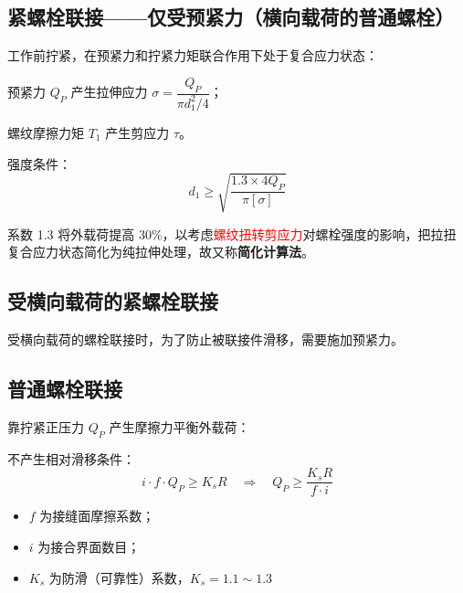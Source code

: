 \subsection{紧螺栓联接——仅受预紧力（横向载荷的普通螺栓）}

工作前拧紧，在预紧力和拧紧力矩联合作用下处于复合应力状态：

预紧力 $Q_P$ 产生拉伸应力 $\sigma=\dfrac{Q_P}{\pi d_1^2/4}$；

螺纹摩擦力矩 $T_1$ 产生剪应力 $\tau$。

\begin{theorem}
强度条件：
\begin{equation}
\label{eq:紧螺栓仅预紧}
    d_1\ge\sqrt{\frac{1.3\times4Q_P}{\pi[\sigma]}}
\end{equation}

\end{theorem}

\begin{keybox}[系数 1.3 的含义]
系数 1.3 将外载荷提高 30\%，以考虑\textcolor{red}{螺纹扭转剪应力}对螺栓强度的影响，把拉扭复合应力状态简化为纯拉伸处理，故又称\textbf{简化计算法}。
\end{keybox}

\subsection{受横向载荷的紧螺栓联接}
受横向载荷的螺栓联接时，为了防止被联接件滑移，需要施加预紧力。


\subsection{普通螺栓联接}

靠拧紧正压力 $Q_P$ 产生摩擦力平衡外载荷：

\begin{theorem}[横向载荷普通螺栓的防滑条件]
\label{thm:横向普通螺栓}
不产生相对滑移条件：
\begin{equation}
	i\cdot f\cdot Q_P\ge K_sR\quad\Rightarrow\quad Q_P\ge\frac{K_sR}{f\cdot i}
	\label{eq:连接:横向防滑}
\end{equation}
\begin{itemize}
    \item $f$ 为接缝面摩擦系数；
    \item $i$ 为接合界面数目；
    \item $K_s$ 为防滑（可靠性）系数，$K_s=1.1\sim1.3$
\end{itemize}
\end{theorem}

